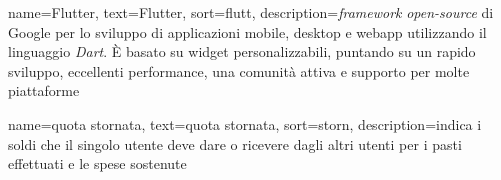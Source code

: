  {
    name=Flutter,
    text=Flutter,
    sort=flutt,
    description={\textit{framework} \textit{open-source} di Google per lo sviluppo di applicazioni mobile, desktop e webapp utilizzando il linguaggio \textit{Dart}. È basato su widget personalizzabili, puntando su un rapido sviluppo, eccellenti performance, una comunità attiva e supporto per molte piattaforme}
}

 {
    name=quota stornata,
    text=quota stornata,
    sort=storn,
    description={indica i soldi che il singolo utente deve dare o ricevere dagli altri utenti per i pasti effettuati e le spese sostenute}
}